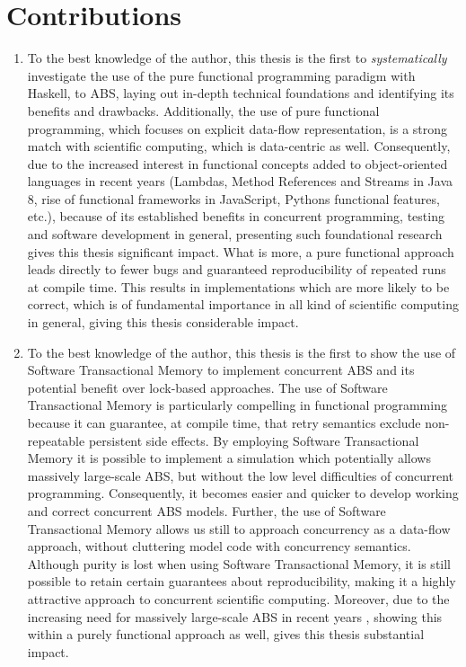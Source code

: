\section{Contributions}
\begin{enumerate}
	\item To the best knowledge of the author, this thesis is the first to \textit{systematically} investigate the use of the pure functional programming paradigm with Haskell, to ABS, laying out in-depth technical foundations and identifying its benefits and drawbacks. Additionally, the use of pure functional programming, which focuses on explicit data-flow representation, is a strong match with scientific computing, which is data-centric as well. Consequently, due to the increased interest in functional concepts added to object-oriented languages in recent years (Lambdas, Method References and Streams in Java 8, rise of functional frameworks in JavaScript, Pythons functional features, etc.), because of its established benefits in concurrent programming, testing and software development in general, presenting such foundational research gives this thesis significant impact. What is more, a pure functional approach leads directly to fewer bugs and guaranteed reproducibility of repeated runs at compile time. This results in implementations which are more likely to be correct, which is of fundamental importance in all kind of scientific computing in general, giving this thesis considerable impact.
	
	\item To the best knowledge of the author, this thesis is the first to show the use of Software Transactional Memory to implement concurrent ABS and its potential benefit over lock-based approaches. The use of Software Transactional Memory is particularly compelling in functional programming because it can guarantee, at compile time, that retry semantics exclude non-repeatable persistent side effects. By employing Software Transactional Memory it is possible to implement a simulation which potentially allows massively large-scale ABS, but without the low level difficulties of concurrent programming. Consequently, it becomes easier and quicker to develop working and correct concurrent ABS models. Further, the use of Software Transactional Memory allows us still to approach concurrency as a data-flow approach, without cluttering model code with concurrency semantics. Although purity is lost when using Software Transactional Memory, it is still possible to retain certain guarantees about reproducibility, making it a highly attractive approach to concurrent scientific computing. Moreover, due to the increasing need for massively large-scale ABS in recent years \cite{lysenko_framework_2008}, showing this within a purely functional approach as well, gives this thesis substantial impact.
	

\end{enumerate}
